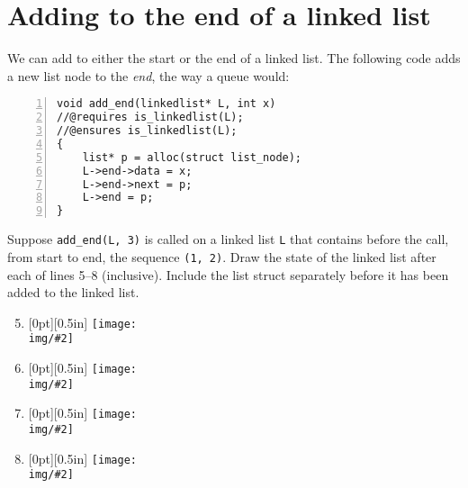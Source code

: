 \newpage
\section*{Adding to the end of a linked list%
}

We can add to either the start or the end of a linked list.  The
following code adds a new list node to the \emph{end}, the way a queue
would:
\begin{lstlisting}[numbers=left]
void add_end(linkedlist* L, int x)
//@requires is_linkedlist(L);
//@ensures is_linkedlist(L);
{
    list* p = alloc(struct list_node);
    L->end->data = x;
    L->end->next = p;
    L->end = p;
}
\end{lstlisting}

Suppose \lstinline'add_end(L, 3)' is called on a linked list
\lstinline'L' that contains before the call, from start to end, the
sequence \lstinline'(1, 2)'.  Draw the state of the linked list after
each of lines 5--8 (inclusive). Include the list struct separately
before it has been added to the linked list.

\begin{enumerate}[1.]
\setcounter{enumi}{4}
\newcommand{\soldepth}{0.5in}
\newcommand{\solraise}{-0.81}
\newcommand{\displaysol}[2][0.55]
  {\raisebox{\solraise\height}[0pt][\soldepth]{%
      \texttt{[image: \\img/\#2]}}}

\item%
  \begin{solution}\displaysol{add-last-5.png}\end{solution}
  \vspace{0.5in}
\item%
  \begin{solution}\displaysol{add-last-6.png}\end{solution}
  \vspace{0.5in}
\item%
  \begin{solution}\displaysol{add-last-7.png}\end{solution}
  \vspace{0.5in}
\item%
  \begin{solution}\displaysol{add-last-8.png}\end{solution}
  \vspace{0.5in}
\end{enumerate}
